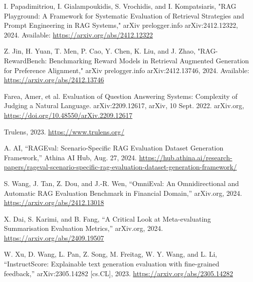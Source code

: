\begin{thebibliography}{00}
 I. Papadimitriou, I. Gialampoukidis, S. Vrochidis, and I. Kompatsiaris, "RAG Playground: A Framework for Systematic Evaluation of Retrieval Strategies and Prompt Engineering in RAG Systems," arXiv prelogger.info arXiv:2412.12322, 2024. Available: \url{https://arxiv.org/abs/2412.12322}

 Z. Jin, H. Yuan, T. Men, P. Cao, Y. Chen, K. Liu, and J. Zhao, "RAG-RewardBench: Benchmarking Reward Models in Retrieval Augmented Generation for Preference Alignment," arXiv prelogger.info arXiv:2412.13746, 2024. Available: \url{https://arxiv.org/abs/2412.13746}

 Farea, Amer, et al. Evaluation of Question Answering Systems: Complexity of Judging a Natural Language. arXiv:2209.12617, arXiv, 10 Sept. 2022. arXiv.org, \url{https://doi.org/10.48550/arXiv.2209.12617}

 Trulens, 2023. \url{https://www.trulens.org/}

 A. AI, “RAGEval: Scenario-Specific RAG Evaluation Dataset Generation Framework,” Athina AI Hub, Aug. 27, 2024. \url{https://hub.athina.ai/research-papers/rageval-scenario-specific-rag-evaluation-dataset-generation-framework/}

 S. Wang, J. Tan, Z. Dou, and J.-R. Wen, “OmniEval: An Omnidirectional and Automatic RAG Evaluation Benchmark in Financial Domain,” arXiv.org, 2024. \url{https://arxiv.org/abs/2412.13018}

 X. Dai, S. Karimi, and B. Fang, “A Critical Look at Meta-evaluating Summarisation Evaluation Metrics,” arXiv.org, 2024. \url{https://arxiv.org/abs/2409.19507}

 W. Xu, D. Wang, L. Pan, Z. Song, M. Freitag, W. Y. Wang, and L. Li, “InstructScore: Explainable text generation evaluation with fine-grained feedback,” arXiv:2305.14282 [cs.CL], 2023. \url{ https://arxiv.org/abs/2305.14282}

\end{thebibliography}